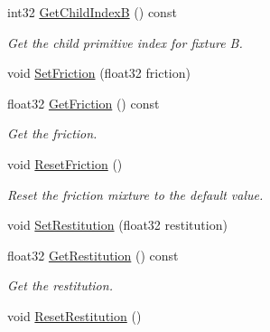 \begin{DoxyCompactItemize}
\item 
\hypertarget{classb2_contact_a9edc26022c3d1a9cf1dab9d79d639b3f}{int32 \hyperlink{classb2_contact_a9edc26022c3d1a9cf1dab9d79d639b3f}{Get\-Child\-Index\-B} () const }\label{classb2_contact_a9edc26022c3d1a9cf1dab9d79d639b3f}

\begin{DoxyCompactList}\small\item\em Get the child primitive index for fixture B. \end{DoxyCompactList}\item 
void \hyperlink{classb2_contact_a5e8fbb6bb2966ac84272bb0ea9d2e4c7}{Set\-Friction} (float32 friction)
\item 
\hypertarget{classb2_contact_a0b6daf4137fd1719961f5d780b8dda15}{float32 \hyperlink{classb2_contact_a0b6daf4137fd1719961f5d780b8dda15}{Get\-Friction} () const }\label{classb2_contact_a0b6daf4137fd1719961f5d780b8dda15}

\begin{DoxyCompactList}\small\item\em Get the friction. \end{DoxyCompactList}\item 
\hypertarget{classb2_contact_ad66d9290da187cef4c9f48c5766d4460}{void \hyperlink{classb2_contact_ad66d9290da187cef4c9f48c5766d4460}{Reset\-Friction} ()}\label{classb2_contact_ad66d9290da187cef4c9f48c5766d4460}

\begin{DoxyCompactList}\small\item\em Reset the friction mixture to the default value. \end{DoxyCompactList}\item 
void \hyperlink{classb2_contact_a24ca342c2bb766c53ef5ad04f5268fc1}{Set\-Restitution} (float32 restitution)
\item 
\hypertarget{classb2_contact_aed12746a2855277479802144b699326b}{float32 \hyperlink{classb2_contact_aed12746a2855277479802144b699326b}{Get\-Restitution} () const }\label{classb2_contact_aed12746a2855277479802144b699326b}

\begin{DoxyCompactList}\small\item\em Get the restitution. \end{DoxyCompactList}\item 
\hypertarget{classb2_contact_a243501bc5c146e9eb1296162d328aef1}{void \hyperlink{classb2_contact_a243501bc5c146e9eb1296162d328aef1}{Reset\-Restitution} ()}\label{classb2_contact_a243501bc5c146e9eb1296162d328aef1}


\end{DoxyCompactItemize}
